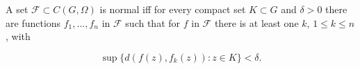 A set $\mathcal{F} \subset C(G, \Omega)$ is normal iff for every compact set $K \subset G$ and $\delta > 0$ there are functions $f_1, \ldots, f_n$ in $\mathcal{F}$ such that for $f$ in $\mathcal{F}$ there is at least one $k$, $1 \leq k \leq n$, with

$$\sup \{d(f(z), f_k(z)) : z \in K\} < \delta.$$
